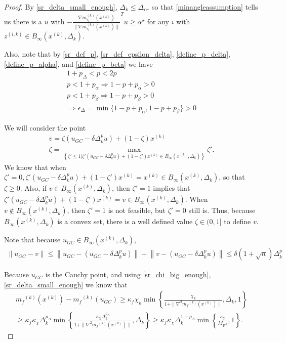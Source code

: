 \documentclass{article}
\theoremstyle{case}
\newcommand{\maxhessian}{{M_{\nabla^2}}}
\newcommand{\xk}{{x^{(k)}}}
\newcommand{\dk}{\Delta_k}
\newcommand{\mfk}{{{m}_f}^{(k)}}
\newcommand{\zik}{{z^{(i, k)}}}
\newcommand{\gmcik}{{\nabla m_{c_i}^{(k)}(\xk)}}
\newcommand{\minangledelta}{{\Delta_{\alpha^{\star}}}}
\newcommand{\minanglealpha}{{ \alpha^{\star} }}
\newcommand{\tr}{{ B_{\infty}\left(\xk, \dk\right) }}
\begin{document}
\begin{proof}
By \cref{sr_delta_small_enough}, $\dk \le \minangledelta$ so that \cref{minangleassumption}
tells us there is a $u$ with $-\frac {\gmcik}{\|\gmcik\|} ^Tu \ge \minanglealpha$ for any $i$ with $\zik \in \tr$.

Also, note that by \cref{sr_def_p}, \cref{sr_def_epsilon_delta}, \cref{define_p_delta}, \cref{define_p_alpha}, and \cref{define_p_beta} we have
\begin{align}
1 + p_{\Delta} < p < 2p\label{sr_p_big} \\
p < 1 + p_{\alpha} \Longrightarrow 1 - p + p_{\alpha} > 0  \label{sr_p_small_alpha} \\
p < 1 + p_{\beta}\Longrightarrow 1 - p + p_{\beta} > 0 \label{sr_p_small_beta} \\
\Longrightarrow \epsilon_{\Delta} = \min\{1 - p + p_{\alpha}, 1 - p + p_{\beta} \} > 0 \label{sr_epsilon_delta_positive}
\end{align}

We will consider the point 
\begin{align}
v = \zeta \left(u_{GC} - \delta \dk^{p} u\right) + (1-\zeta)\xk \label{define_v} \\
\zeta = \max_{\left\{\zeta' \le 1 | \zeta' \left(u_{GC} - \delta \dk^{p} u\right) + (1-\zeta')\xk \in \tr\right\}} \zeta' \label{define_zeta}.
\end{align}
We know that when $\zeta' = 0,  \zeta' \left(u_{GC} - \delta \dk^{p} u\right) + (1-\zeta')\xk = \xk \in \tr$, so that $\zeta \ge 0$.
Also, if $v\in\tr$, then $\zeta' = 1$ implies that $\zeta' \left(u_{GC} - \delta \dk^{p} u\right) + (1-\zeta')\xk = v \in \tr$.
When $v\not\in\tr$, then $\zeta' = 1$ is not feasible, but $\zeta' = 0$ still is.
Thus, because $\tr$ is a convex set, there is a well defined value $\zeta \in (0, 1]$ to define $v$.

Note that because $u_{GC} \in \tr$, 
\begin{align}
\|u_{GC} - v\| \le \left\|u_{GC} - \left(u_{GC} - \delta \dk^{p} u\right)\right\| + \left\|v - \left(u_{GC} - \delta \dk^{p} u\right)\right\| 
\le \delta\left(1 + \sqrt{n}\right) \dk^{p} \label{sr_v_close_u}
\end{align}

Because $u_{GC}$ is the Cauchy point, and using \cref{sr_chi_big_enough}, \cref{sr_delta_small_enough} we know that
\begin{align*}
\mfk(\xk) - \mfk(u_{GC})
 \ge \kappa_f \chi_k \min\left\{ \frac{\chi_k}{1+\|\nabla^2 \mfk(\xk)\|}, \dk, 1 \right\} \\
 \ge \kappa_f \kappa_{\chi} \dk^{p_{\Delta}} \min\left\{ \frac{\kappa_{\chi} \dk^{p_{\Delta}}}{1+\|\nabla^2 \mfk(\xk)\|}, \dk \right\}
 \ge \kappa_f \kappa_{\chi} \dk^{1 + p_{\Delta}} \min\left\{ \frac{\kappa_{\chi}}{\maxhessian}, 1 \right\}.
\end{align*}



\end{proof}
\end{document}
